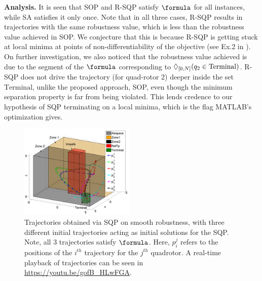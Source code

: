 \textbf{Analysis.} It is seen that SOP and R-SQP satisfy $\formula$ for all instances, while SA satisfies it only once.
Note that in all three cases, R-SQP results in trajectories with the same robustness value, which is less than the robustness value achieved in SOP.
We conjecture that this is because R-SQP is getting stuck at local minima at points of non-differentiability of the objective (see Ex.2 in \cite{PantAM17_SmoothOpTechRpt}).
On further investigation, we also noticed that the robustness value achieved is due to the segment of the $\formula$ corresponding to $\Diamond_{[0,N]}(q_2 \in \text{Terminal})$. R-SQP does not drive the trajectory (for quad-rotor 2) deeper inside the set $\text{Terminal}$, unlike the proposed approach, SOP, even though the minimum separation property is far from being violated. This lends credence to our hypothesis of SQP terminating on a local minima, which is the flag MATLAB's optimization gives. 



\begin{figure}[t]
\centering
\includegraphics[width=0.49\textwidth]{figures/QuadTrajs_u_scissored}
\vspace{-10pt}
\caption{{\small Trajectories obtained via SQP on smooth robustness, with three different initial trajectories acting as initial solutions for the SQP. Note, all 3 trajectories satisfy $\formula$. Here, $p_{i}^j$ refers to the positions of the $i^{th}$ trajectory for the $j^{th}$ quadrotor. 
A real-time playback of trajectories can be seen in \protect\url{https://youtu.be/gofB_HLwFGA}.}}
\vspace{-10pt}
\label{fig:quad_ssqp}
\end{figure}


